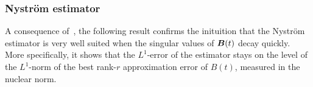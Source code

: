 %
%
%
\subsubsection{Nyström estimator}
\label{subsec:nystrom}

A consequence of~\cite{kressner-2024-randomized-lowrank}, the following result confirms the inituition that the Nystr\"om estimator is very well suited when the singular values of $\boldsymbol{B}(t)$ decay quickly. More specifically, it shows that the $L^1$-error of the estimator stays on the level of the $L^1$-norm of the best rank-$r$ approximation error of $B(t)$, measured in the nuclear norm.

